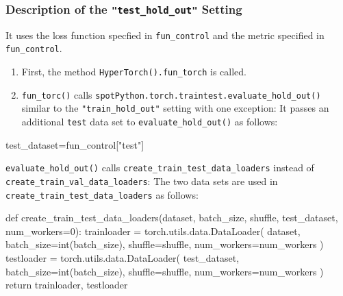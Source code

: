\documentclass[
  letterpaper,
  DIV=11,
  numbers=noendperiod]{scrreprt}
\newenvironment{Shaded}{\begin{snugshade}}{\end{snugshade}}
\newcommand{\NormalTok}[1]{\textcolor[rgb]{0.00,0.23,0.31}{#1}}
\providecommand{\tightlist}{%
  \setlength{\itemsep}{0pt}\setlength{\parskip}{0pt}}\usepackage{longtable,booktabs,array}
\begin{document}
\hypertarget{description-of-the-test_hold_out-setting}{%
\subsubsection{\texorpdfstring{Description of the
\texttt{"test\_hold\_out"}
Setting}{Description of the "test\_hold\_out" Setting}}\label{description-of-the-test_hold_out-setting}}

It uses the loss function specfied in \texttt{fun\_control} and the
metric specified in \texttt{fun\_control}.

\begin{enumerate}
\def\labelenumi{\arabic{enumi}.}
\tightlist
\item
  First, the method \texttt{HyperTorch().fun\_torch} is called.
\item
  \texttt{fun\_torc()} calls
  \texttt{spotPython.torch.traintest.evaluate\_hold\_out()} similar to
  the \texttt{"train\_hold\_out"} setting with one exception: It passes
  an additional \texttt{test} data set to \texttt{evaluate\_hold\_out()}
  as follows:
\end{enumerate}

\begin{Shaded}
\begin{Highlighting}[]
\NormalTok{test\_dataset=fun\_control["test"]}
\end{Highlighting}
\end{Shaded}

\texttt{evaluate\_hold\_out()} calls
\texttt{create\_train\_test\_data\_loaders} instead of
\texttt{create\_train\_val\_data\_loaders}: The two data sets are used
in \texttt{create\_train\_test\_data\_loaders} as follows:

\begin{Shaded}
\begin{Highlighting}[]
\NormalTok{def create\_train\_test\_data\_loaders(dataset, batch\_size, shuffle, test\_dataset, }
\NormalTok{        num\_workers=0):}
\NormalTok{    trainloader = torch.utils.data.DataLoader(}
\NormalTok{        dataset, batch\_size=int(batch\_size), shuffle=shuffle, }
\NormalTok{        num\_workers=num\_workers}
\NormalTok{    )}
\NormalTok{    testloader = torch.utils.data.DataLoader(}
\NormalTok{        test\_dataset, batch\_size=int(batch\_size), shuffle=shuffle, }
\NormalTok{        num\_workers=num\_workers}
\NormalTok{    )}
\NormalTok{    return trainloader, testloader}
\end{Highlighting}
\end{Shaded}
\end{document}
